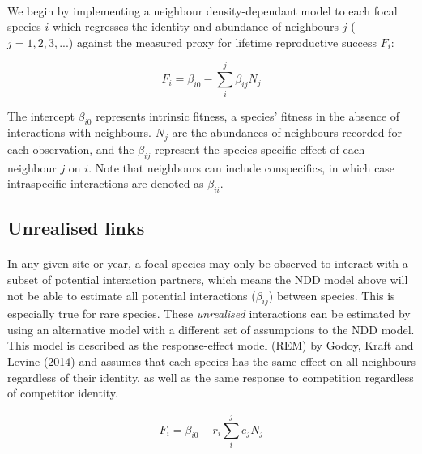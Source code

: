 \documentclass[a4,12pt]{article}
\begin{document}
        \paragraph{}
        We begin by implementing a neighbour density-dependant model to each focal species $i$ which regresses the identity and abundance of neighbours $j$ ($j = 1, 2, 3, ...$) against the measured proxy for lifetime reproductive success $F_{i}$:
        
        \begin{equation}
        F_{i} = \beta_{i0} - \sum_{i}^{j} \beta_{ij} N_{j}
        \label{ifm}
        \end{equation}
        
        The intercept $\beta_{i0}$ represents intrinsic fitness, a species' fitness in the absence of interactions with neighbours. $N_{j}$ are the abundances of neighbours recorded for each observation, and the $\beta_{ij}$ represent the species-specific effect of each neighbour $j$ on $i$. Note that neighbours can include conspecifics, in which case intraspecific interactions are denoted as $\beta_{ii}$.
              
    \subsection{Unrealised links}
    
        \paragraph{}
        In any given site or year, a focal species may only be observed to interact with a subset of potential interaction partners, which means the NDD model above will not be able to estimate all potential interactions ($\beta_{ij}$) between species. This is especially true for rare species. These \textit{unrealised} interactions can be estimated by using an alternative model with a different set of assumptions to the NDD model. This model is described as the response-effect model (REM) by Godoy, Kraft and Levine (2014) and assumes that each species has the same effect on all neighbours regardless of their identity, as well as the same response to competition regardless of competitor identity. 
        
        \begin{equation}
        F_{i} = \beta_{i0} - r_{i} \sum_{i}^{j} e_{j} N_{j}
        \label{rem1}
        \end{equation}
        
\end{document}
